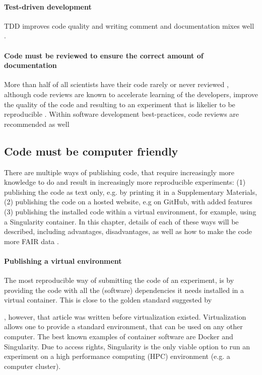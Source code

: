\paragraph{Test-driven development}

TDD improves code quality \cite{alkaoud2018quality,janzen2006test}
and writing comment and documentation mixes well \cite{shmerlin2015document}.

\paragraph{Code must be reviewed to ensure the correct amount of documentation}

More than half of all scientists have their code 
rarely or never reviewed \cite{vable2021code},
although code reviews are known to
accelerate learning of the developers,
improve the quality of the code
and resulting to an experiment that is likelier to be reproducible
\cite{vable2021code}.
Within software development best-practices, 
code reviews are recommended as well \cite{wilson2014best} 


\subsection{Code must be computer friendly}

There are multiple ways of publishing code,
that require increasingly more knowledge to do and result
in increasingly more reproducible experiments:
(1) publishing the code as text only, e.g. by printing
it in a Supplementary Materials, (2) publishing
the code on a hosted website, e.g on GitHub, with
added features (3) publishing 
the installed code within a virtual environment,
for example, using a Singularity container.
In this chapter, details of each of these ways will be described,
including advantages, disadvantages, as well as how to
make the code more FAIR data \cite{wilkinson2016fair}.

\paragraph{Publishing a virtual environment}

The most reproducible way of submitting the code of an experiment,
is by providing the code with all the (software) dependencies 
it needs installed in a virtual container.
This is close to the golden standard suggested by 
\cite{peng2011reproducible} 

,
however, that article was written before virtualization existed.
Virtualization allows one to provide a standard environment,
that can be used on any other computer.
The best known examples of container software are Docker and Singularity.
Due to access rights, Singularity is the only viable option to run
an experiment on a 
high performance computing (HPC) environment (e.g. a computer cluster).

